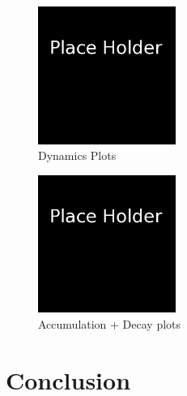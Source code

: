 \documentclass[letterpaper,twocolumn]{article}
\begin{document}
\begin{figure}[htbp]
\begin{center}
\includegraphics[width=0.4\textwidth]{figures/place_holder}
\caption{Dynamics Plots}
\label{dynamics_figure}
\end{center}
\end{figure}

\begin{figure}[htbp]
\begin{center}
\includegraphics[width=0.4\textwidth]{figures/place_holder}
\caption{Accumulation + Decay plots}
\label{accum_decay}
\end{center}
\end{figure}

\section*{Conclusion}

{}

\end{document}
